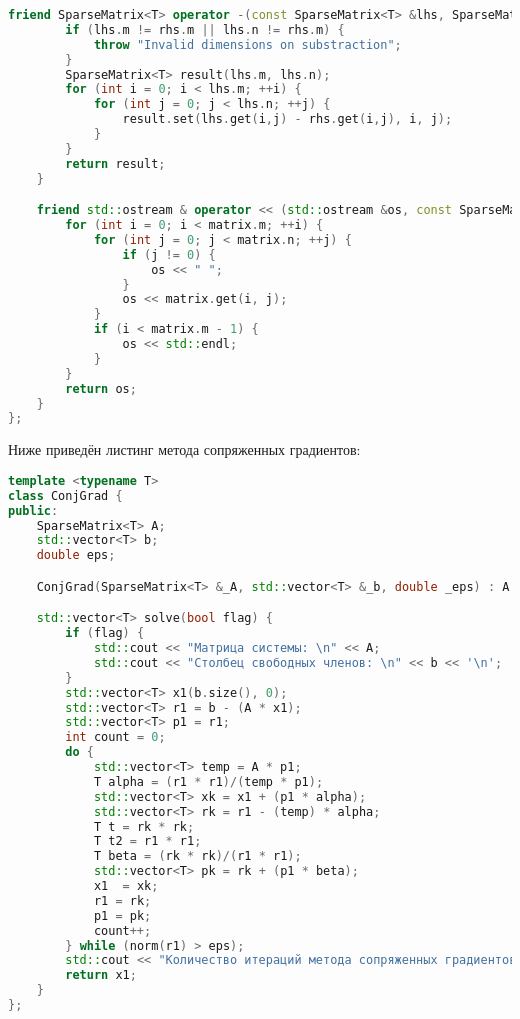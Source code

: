 \begin{lstlisting}[language=C++]
    friend SparseMatrix<T> operator -(const SparseMatrix<T> &lhs, SparseMatrix<T> &rhs) {
        if (lhs.m != rhs.m || lhs.n != rhs.m) {
            throw "Invalid dimensions on substraction";
        }
        SparseMatrix<T> result(lhs.m, lhs.n);
        for (int i = 0; i < lhs.m; ++i) {
            for (int j = 0; j < lhs.n; ++j) {
                result.set(lhs.get(i,j) - rhs.get(i,j), i, j);
            }
        }
        return result;
    }

    friend std::ostream & operator << (std::ostream &os, const SparseMatrix<T> &matrix) {
        for (int i = 0; i < matrix.m; ++i) {
            for (int j = 0; j < matrix.n; ++j) {
                if (j != 0) {
                    os << " ";
                }
                os << matrix.get(i, j);
            }
            if (i < matrix.m - 1) {
                os << std::endl;
            }
        }
        return os;
    }
};
\end{lstlisting}

Ниже приведён листинг метода сопряженных градиентов:

\begin{lstlisting}[language=C++]
template <typename T>
class ConjGrad {
public:
    SparseMatrix<T> A;
    std::vector<T> b;
    double eps;

    ConjGrad(SparseMatrix<T> &_A, std::vector<T> &_b, double _eps) : A(_A), b(_b), eps(_eps) {};

    std::vector<T> solve(bool flag) {
        if (flag) {
            std::cout << "Матрица системы: \n" << A;
            std::cout << "Столбец свободных членов: \n" << b << '\n';
        }
        std::vector<T> x1(b.size(), 0);
        std::vector<T> r1 = b - (A * x1);
        std::vector<T> p1 = r1;
        int count = 0;
        do {
            std::vector<T> temp = A * p1;
            T alpha = (r1 * r1)/(temp * p1);
            std::vector<T> xk = x1 + (p1 * alpha);
            std::vector<T> rk = r1 - (temp) * alpha;
            T t = rk * rk;
            T t2 = r1 * r1;
            T beta = (rk * rk)/(r1 * r1);
            std::vector<T> pk = rk + (p1 * beta);
            x1  = xk;
            r1 = rk;
            p1 = pk;
            count++;
        } while (norm(r1) > eps);
        std::cout << "Количество итераций метода сопряженных градиентов: " << count << "\n";
        return x1;
    }
};
\end{lstlisting}
\pagebreak
